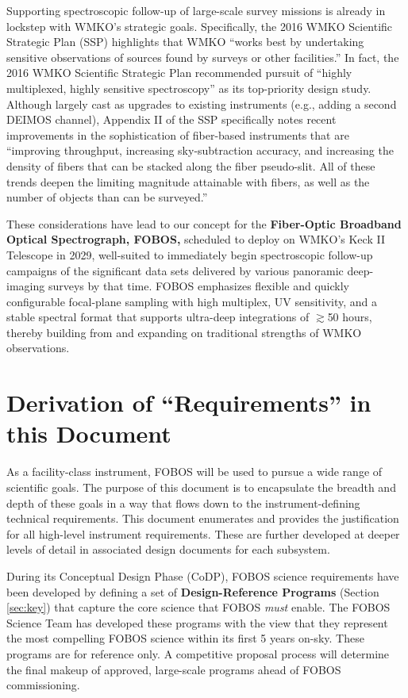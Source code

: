 \documentclass[11pt,a4paper,twoside,onecolumn,openany,final,oldfontcommands]{memoir}
\begin{document}
Supporting spectroscopic follow-up of large-scale survey missions is already in lockstep with WMKO's strategic goals.  Specifically, the 2016 WMKO Scientific Strategic Plan (SSP) highlights that WMKO ``works best by undertaking sensitive observations of sources found by surveys or other facilities.''  In fact, the 2016 WMKO Scientific Strategic Plan recommended pursuit of ``highly multiplexed, highly sensitive spectroscopy'' as its top-priority design study.  Although largely cast as upgrades to existing instruments (e.g., adding a second DEIMOS channel), Appendix II of the SSP specifically notes recent improvements in the sophistication of fiber-based instruments that are ``improving throughput, increasing sky-subtraction accuracy, and increasing the density of fibers that can be stacked along the fiber pseudo-slit. All of these trends deepen the limiting magnitude attainable with fibers, as well as the number of objects than can be surveyed.''

These considerations have lead to our concept for the \textbf{Fiber-Optic Broadband Optical Spectrograph, FOBOS,} scheduled to deploy on WMKO's Keck II Telescope in 2029, well-suited to immediately begin spectroscopic follow-up campaigns of the significant data sets delivered by various panoramic deep-imaging surveys by that time.  FOBOS emphasizes flexible and quickly configurable focal-plane sampling with high multiplex, UV sensitivity, and a stable spectral format that supports ultra-deep integrations of $\gtrsim$50 hours, thereby building from and expanding on traditional strengths of WMKO observations.

\section{Derivation of ``Requirements'' in this Document}

As a facility-class instrument, FOBOS will be used to pursue a wide range of scientific goals.  The purpose of this document is to encapsulate the breadth and depth of these goals in a way that flows down to the instrument-defining technical requirements.  This document enumerates and provides the justification for all high-level instrument requirements.  These are further developed at deeper levels of detail in associated design documents for each subsystem.

During its Conceptual Design Phase (CoDP), FOBOS science requirements have been developed by defining a set of \textbf{Design-Reference Programs} (Section \ref{sec:key}) that capture the core science that FOBOS \textit{must} enable.  The FOBOS Science Team has developed these programs with the view that they represent the most compelling FOBOS science within its first 5 years on-sky.  These programs are for reference only.  A competitive proposal process will determine the final makeup of approved, large-scale programs ahead of FOBOS commissioning. 
\end{document}
